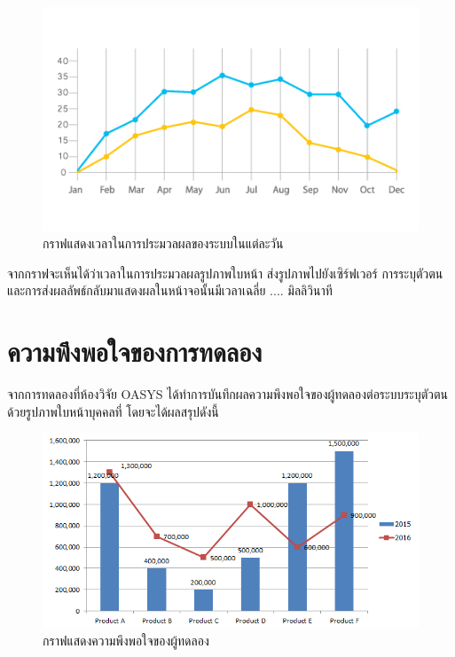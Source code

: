 \begin{figure}[!ht]
  \begin{center}
    \includegraphics[scale=.7]{pic/graph_acc.jpg}
    \caption[กราฟแสดงเวลาในการประมวลผลของระบบในแต่ละวัน]{กราฟแสดงเวลาในการประมวลผลของระบบในแต่ละวัน}
    \label{fig:time_graph}
  \end{center}
\end{figure}
\newpage
\indent จากกราฟจะเห็นได้ว่าเวลาในการประมวลผลรูปภาพใบหน้า ส่งรูปภาพไปยังเซิร์ฟเวอร์ การระบุตัวตน และการส่งผลลัพธ์กลับมาแสดงผลในหน้าจอนั้นมีเวลาเฉลี่ย .... มิลลิวินาที



\section{ความพึงพอใจของการทดลอง}
จากการทดลองที่ห้องวิจัย OASYS ได้ทำการบันทึกผลความพึงพอใจของผู้ทดลองต่อระบบระบุตัวตนด้วยรูปภาพใบหน้าบุคคลที่ โดยจะได้ผลสรุปดังนี้

\begin{figure}[!ht]
    \begin{center}
      \includegraphics[scale=.5]{pic/bar_graph.png}
      \caption[กราฟแสดงความพึงพอใจของผู้ทดลอง]{กราฟแสดงความพึงพอใจของผู้ทดลอง}
      \label{fig:bar_graph}
    \end{center}
  \end{figure}